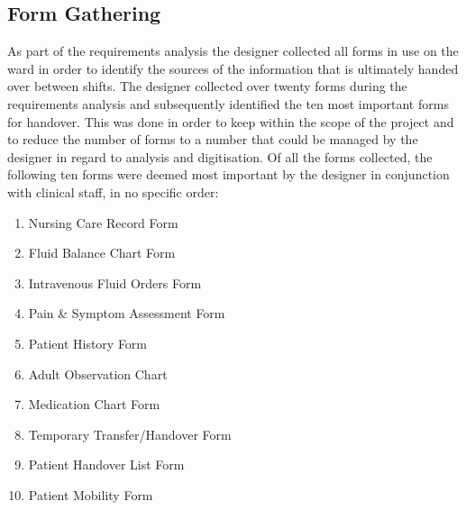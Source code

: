\subsection{Form Gathering}
As part of the requirements analysis the designer collected all forms in use on the ward in order to identify the sources of the information that is ultimately handed over between shifts. The designer collected over twenty forms during the requirements analysis and subsequently identified the ten most important forms for handover. This was done in order to keep within the scope of the project and to reduce the number of forms to a number that could be managed by the designer in regard to analysis and digitisation. Of all the forms collected, the following ten forms were deemed most important by the designer in conjunction with clinical staff, in no specific order:

\begin{enumerate}
\item Nursing Care Record Form
\item Fluid Balance Chart Form
\item Intravenous Fluid Orders Form
\item Pain \& Symptom Assessment Form
\item Patient History Form
\item Adult Observation Chart
\item Medication Chart Form
\item Temporary Transfer/Handover Form
\item Patient Handover List Form
\item Patient Mobility Form
\end{enumerate}

